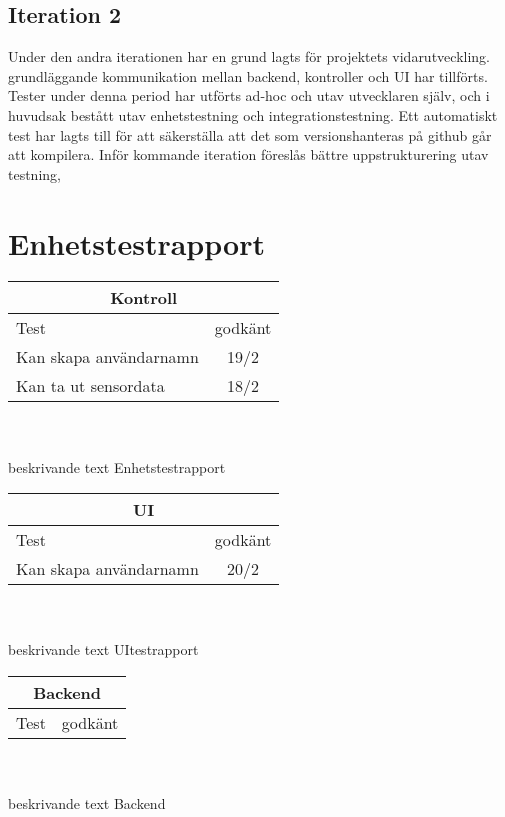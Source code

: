 \documentclass[10pt]{article}
\begin{document}
\subsection{Iteration 2}
Under den andra iterationen har en grund lagts för projektets vidarutveckling. grundläggande kommunikation mellan backend, kontroller och UI har tillförts. Tester under denna period har utförts ad-hoc och utav utvecklaren själv, och i huvudsak bestått utav enhetstestning och integrationstestning. Ett automatiskt test har lagts till för att säkerställa att det som versionshanteras på github går att kompilera. Inför kommande iteration föreslås bättre uppstrukturering utav testning,

\section{Enhetstestrapport}
  \begin{tabular}{|l| c|}
  \hline
    \multicolumn{2}{|c|}{Kontroll}\\
    \hline
    Test&godkänt\\
   \hline
   Kan skapa användarnamn&19/2\\
   \hline
   Kan ta ut sensordata&18/2\\
   \hline
   
  \end{tabular}
  \\
  \\
  
  beskrivande text Enhetstestrapport
  \\
  
  \noindent
    \begin{tabular}{|l| c|}
    \hline
    \multicolumn{2}{|c|}{UI}\\
    \hline
    Test&godkänt\\
   \hline
   Kan skapa användarnamn&20/2\\
   \hline
   
  \end{tabular}
  \\
  \\
  beskrivande text UItestrapport
\\

  \noindent
\begin{tabular}{|l| c|}
  \hline
    \multicolumn{2}{|c|}{Backend}\\
    \hline
    Test&godkänt\\
   \hline
   
   
  \end{tabular}
  \\
  \\
  beskrivande text Backend
  \\
\end{document}
